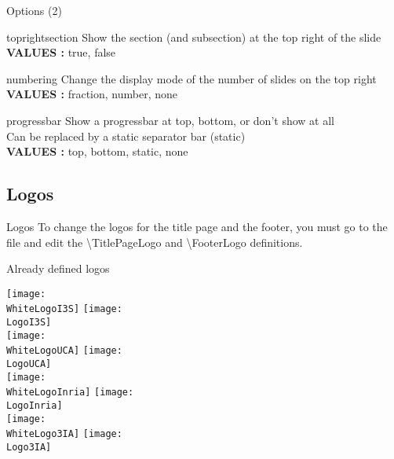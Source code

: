 \documentclass[aspectratio=43]{beamer}
\begin{document}
\begin{frame}{Options (2)}

    \begin{cblock}[yellow]{toprightsection}
        Show the section (and subsection) at the top right of the slide\\
        \textbf{VALUES :} true, false
    \end{cblock}\nline

    \begin{cblock}[orange]{numbering}
        Change the display mode of the number of slides on the top right\\
        \textbf{VALUES :} fraction, number, none
    \end{cblock}\nline

    \begin{cblock}[red]{progressbar}
        Show a progressbar at top, bottom, or don't show at all\\
        Can be replaced by a static separator bar (static)\\
        \textbf{VALUES :} top, bottom, static, none
    \end{cblock}

\end{frame}

\subsection{Logos}

\begin{frame}{Logos}
    To change the logos for the title page and the footer, you must go to the  file and edit the \textbackslash TitlePageLogo and \textbackslash FooterLogo definitions.\nline 

    \begin{exampleblock}{Already defined logos}
        \centering

        \texttt{[image: \\WhiteLogoI3S]}
        \hfill
        \texttt{[image: \\LogoI3S]}\\

        \texttt{[image: \\WhiteLogoUCA]}
        \hfill
        \texttt{[image: \\LogoUCA]}\\

        \texttt{[image: \\WhiteLogoInria]}
        \hfill
        \texttt{[image: \\LogoInria]}\\

        \texttt{[image: \\WhiteLogo3IA]}
        \hfill
        \texttt{[image: \\Logo3IA]}

    \end{exampleblock}
\end{frame}

\end{document}
